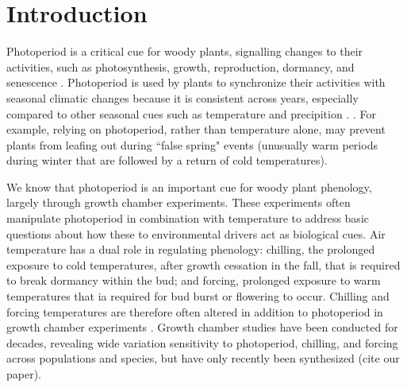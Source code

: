 \documentclass{article}
\begin{document}
\section*{Introduction}
\par  Photoperiod is a critical cue for woody plants, signalling changes to their activities, such as photosynthesis, growth, reproduction, dormancy, and senescence \citep[e.g.,][]{Howe:1996,lagercrantz2009}. Photoperiod is used by plants to synchronize their activities with seasonal climatic changes \citep[e.g.,][]{Hsu:2011,Singh:2017,Basler:2012} because it is consistent across years, especially compared to other seasonal cues such as temperature and precipition \citep{saikkonen2012}. 
. For example, relying on photoperiod, rather than temperature alone, may prevent plants from leafing out during ``false spring" events (unusually warm periods during winter that are followed by a return of cold temperatures). %

\par We know that photoperiod is an important cue for woody plant phenology, largely through growth chamber experiments.  These experiments often manipulate photoperiod in combination with temperature to address basic questions about how these to environmental drivers act as biological cues. Air temperature has a dual role in regulating phenology: chilling, the prolonged exposure to cold temperatures, after growth cessation in the fall, that is required to break dormancy within the bud; and forcing, prolonged exposure to warm temperatures that ia required for bud burst or flowering to occur. Chilling and forcing temperatures are therefore often altered in addition to photoperiod in growth chamber experiments \citep[e.g.,][]{Campbell:1975aa,HEIDE:1977aa,Falusi:1990aa,Spann:2004aa,Laube:2014a}. Growth chamber studies have been conducted for decades, revealing wide variation sensitivity to photoperiod, chilling, and forcing across populations and species, but have only recently been synthesized (cite our paper).
 
\end{document}
